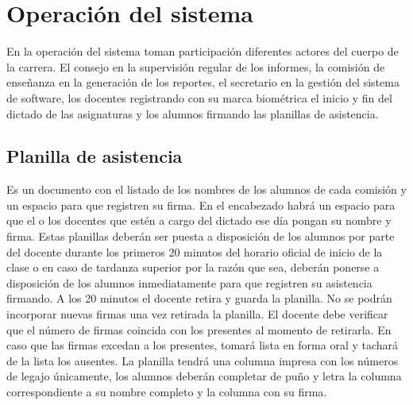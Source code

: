 \documentclass[a4paper, 11pt]{article} %
\begin{document}
\section{Operación del sistema}
En la operación del sistema toman participación diferentes actores del cuerpo de la carrera. El consejo en la supervisión regular de los informes, la comisión de enseñanza en la generación de los reportes, el secretario en la gestión del sistema de software, los docentes registrando con su marca biométrica el inicio y fin del dictado de las asignaturas y los alumnos firmando las planillas de asistencia.
\subsection{Planilla de asistencia}
Es un documento con el listado de los nombres de los alumnos de cada comisión y un espacio para que registren su firma.
En el encabezado habrá un espacio para que el o los docentes que estén a cargo del dictado ese día pongan su nombre y firma. Estas planillas deberán ser puesta a disposición de los alumnos por parte del docente durante los primeros 20 minutos del horario oficial de inicio de la clase o en caso de tardanza superior por la razón que sea, deberán ponerse a disposición de los alumnos inmediatamente para que registren su asistencia firmando. A los 20 minutos el docente retira y guarda la planilla. No se podrán incorporar nuevas firmas una vez retirada la planilla. El docente debe verificar que el número de firmas coincida con los presentes al momento de retirarla. En caso que las firmas excedan a los presentes, tomará lista en forma oral y tachará de la lista los ausentes. La planilla tendrá una columna impresa con los números de legajo únicamente, los alumnos deberán completar de puño y letra la columna correspondiente a su nombre completo y la columna con su firma.\\
\end{document}
